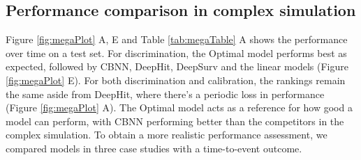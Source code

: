 \documentclass[APA,LATO1COL]{WileyNJD-v2}
\begin{document}
\hypertarget{performance-comparison-in-complex-simulation}{%
\subsection{Performance comparison in complex
simulation}\label{performance-comparison-in-complex-simulation}}


Figure \ref{fig:megaPlot} A, E and Table \ref{tab:megaTable} A
shows the performance over time on a test set. For discrimination, the Optimal model
performs best as expected, followed by CBNN, DeepHit, DeepSurv and the linear models (Figure \ref{fig:megaPlot} E).
For both discrimination and calibration, the rankings remain the same aside from DeepHit,
where there's a periodic loss in performance (Figure \ref{fig:megaPlot} A). The
Optimal model acts as a reference for how good a model can perform,
with CBNN performing better than the competitors in the complex simulation.
To obtain a more realistic performance assessment, we compared models in
three case studies with a time-to-event outcome.
\end{document}
